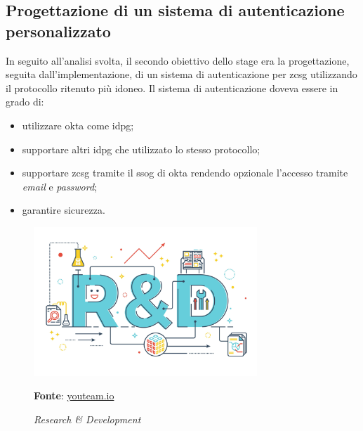     \subsection{Progettazione di un sistema di autenticazione personalizzato}
        In seguito all'analisi svolta, il secondo obiettivo dello stage era la progettazione, seguita dall'implementazione, di un sistema di autenticazione per \gls{zcsg} utilizzando il protocollo ritenuto più idoneo. Il sistema di autenticazione doveva essere in grado di:
        \begin{itemize}
            \setlength\itemsep{0em}
            \item utilizzare \gls{okta} come \gls{idpg};
            \item supportare altri \gls{idpg} che utilizzato lo stesso protocollo;
            \item supportare \gls{zcsg} tramite il \gls{ssog} di \gls{okta} rendendo opzionale l'accesso tramite \textit{email} e \textit{password};
            \item garantire sicurezza.
        \end{itemize}
    \newpage
    \begin{figure}[h]
        \centering
        \includegraphics[width=0.75\textwidth]{immagini/rd.jpg}
        \caption{\textit{Research \& Development}}
        \textbf{Fonte}:
        \href{https://youteam.io/blog/research-and-development-the-fourth-pillar-of-software-development/}{youteam.io}
        \label{fig: Research & Development}
    \end{figure}
    
